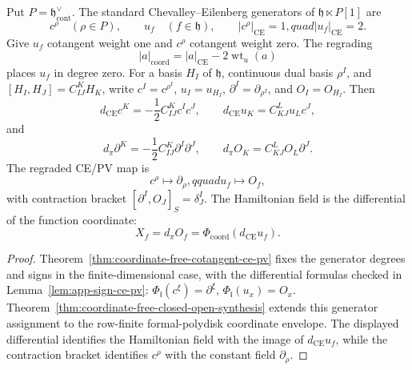 \documentclass[11pt]{memoir}
\begin{document}
\begin{lem}\label{lem:type-discipline}
  Put \(P=\mathfrak h^\vee_{\mathrm{cont}}\).  The standard
  Chevalley--Eilenberg generators of
  \(\mathfrak h\ltimes P[1]\) are
  \[
    c^\rho\quad(\rho\in P),\qquad
    u_f\quad(f\in\mathfrak h),
    \qquad
    |c^\rho|_{\mathrm{CE}}=1,quad |u_f|_{\mathrm{CE}}=2.
  \]
  Give \(u_f\) cotangent weight one and \(c^\rho\) cotangent weight
  zero.  The regrading
  \[
    |a|_{\mathrm{coord}}
    =|a|_{\mathrm{CE}}-2\operatorname{wt}_u(a)
  \]
  places \(u_f\) in degree zero.  For a basis \(H_I\) of
  \(\mathfrak h\), continuous dual basis \(\rho^I\), and
  \([H_I,H_J]=C^K_{IJ}H_K\), write
  \(c^I=c^{\rho^I}\), \(u_I=u_{H_I}\),
  \(\partial^I=\partial_{\rho^I}\), and \(O_I=O_{H_I}\).  Then
  \[
    d_{\mathrm{CE}}c^K=-\frac12 C^K_{IJ}c^Ic^J,
    \qquad
    d_{\mathrm{CE}}u_K=C^L_{KJ}u_Lc^J,
  \]
  and
  \[
    d_\pi\partial^K=-\frac12 C^K_{IJ}\partial^I\partial^J,
    \qquad
    d_\pi O_K=C^L_{KJ}O_L\partial^J.
  \]
  The regraded CE/PV map is
  \[
    c^\rho\longmapsto\partial_\rho,qquad
    u_f\longmapsto O_f,
  \]
  with contraction bracket
  \([\partial^I,O_J]_S=\delta^I_J\).  The Hamiltonian field is the
  differential of the function coordinate:
  \[
    X_f=d_\pi O_f=\Phi_{\mathrm{coord}}(d_{\mathrm{CE}}u_f).
  \]
\end{lem}

\begin{proof}
  Theorem~\ref{thm:coordinate-free-cotangent-ce-pv} fixes the generator
  degrees and signs in the finite-dimensional case, with the differential
  formulas checked in Lemma~\ref{lem:app-sign-ce-pv}:
  \(\Phi_{\mathfrak l}(c^\xi)=\partial^\xi\),
  \(\Phi_{\mathfrak l}(u_x)=O_x\).
  Theorem~\ref{thm:coordinate-free-closed-open-synthesis} extends this
  generator assignment to the row-finite formal-polydisk coordinate
  envelope.  The displayed differential identifies the Hamiltonian
  field with the image of \(d_{\mathrm{CE}}u_f\), while the contraction
  bracket identifies \(c^\rho\) with the constant field
  \(\partial_\rho\).
\end{proof}
\end{document}
